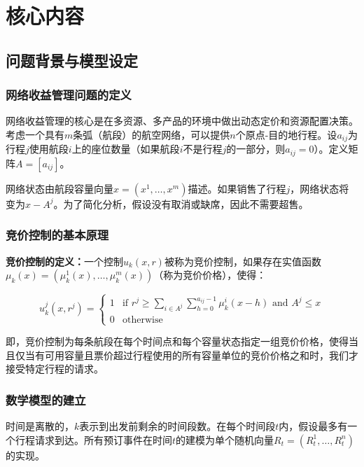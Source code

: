 \documentclass[
  10pt
]{article}
\begin{document}
\section{核心内容}

\subsection{问题背景与模型设定}

\subsubsection{网络收益管理问题的定义}

网络收益管理的核心是在多资源、多产品的环境中做出动态定价和资源配置决策。考虑一个具有$m$条弧（航段）的航空网络，可以提供$n$个原点-目的地行程。设$a_{ij}$为行程$j$使用航段$i$上的座位数量（如果航段$i$不是行程$j$的一部分，则$a_{ij} = 0$）。定义矩阵$A = [a_{ij}]$。

网络状态由航段容量向量$x = (x^1, \ldots, x^m)$描述。如果销售了行程$j$，网络状态将变为$x - A^j$。为了简化分析，假设没有取消或缺席，因此不需要超售。

\subsubsection{竞价控制的基本原理}

\begin{definitionbox}
\textbf{竞价控制的定义：}一个控制$u_k(x,r)$被称为竞价控制，如果存在实值函数$\mu_k(x) = (\mu_k^1(x), \ldots, \mu_k^m(x))$（称为竞价价格），使得：

$$u_k^j(x,r^j) = \begin{cases}
1 & \text{if } r^j \geq \sum_{i \in A^j} \sum_{h=0}^{a_{ij}-1} \mu_k^i(x-h) \text{ and } A^j \leq x \\
0 & \text{otherwise}
\end{cases}$$

即，竞价控制为每条航段在每个时间点和每个容量状态指定一组竞价价格，使得当且仅当有可用容量且票价超过行程使用的所有容量单位的竞价价格之和时，我们才接受特定行程的请求。
\end{definitionbox}

\subsubsection{数学模型的建立}

时间是离散的，$k$表示到出发前剩余的时间段数。在每个时间段$t$内，假设最多有一个行程请求到达。所有预订事件在时间$t$的建模为单个随机向量$R_t = (R_t^1, \ldots, R_t^n)$的实现。
\end{document}
